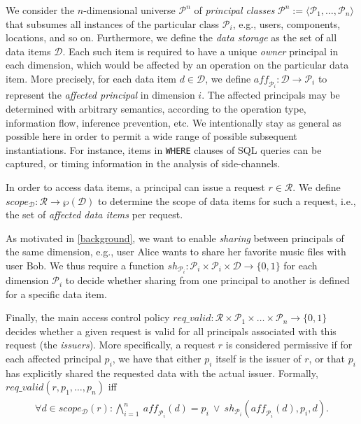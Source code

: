 \documentclass{src/acm_proc_article-sp} \else
\newcommand\cD{\ensuremath{\mathcal{D}}\xspace}
\newcommand\cP{\ensuremath{\mathcal{P}}\xspace}
\newcommand\cR{\ensuremath{\mathcal{R}}\xspace}
\begin{document}
We consider the $n$-dimensional universe $\cP^n$ of
\emph{principal classes}
$\cP^n := \langle \cP_1, \ldots, \cP_n \rangle $ that subsumes all
instances of the particular class $\cP_i$, e.g., users,
components, locations, and so on. Furthermore, we define the
\emph{data storage} as the set of all data items \cD. Each
such item is required to have a unique \emph{owner}
principal in each dimension, which would be affected by an
operation on the particular data item. More precisely, for
each data item $d\in\cD$, we define
$
  \mathit{aff_{\cP_i}}\colon \cD \rightarrow \cP_i
$
to represent the \emph{affected principal} in dimension $i$.
The affected principals may be determined with arbitrary
semantics, according to the operation type, information
flow, inference prevention, etc. We intentionally stay as
general as possible here in order to permit a wide range of
possible subsequent instantiations. For instance, items in
\texttt{WHERE} clauses of SQL queries can be captured, or
timing information in the analysis of side-channels.

In order to access data items, a principal can issue a
request $r \in \cR$. We define
$
  \mathit{scope_{\cD}}\colon \cR \rightarrow \wp(\cD)
$
to determine the scope of data items for such a request,
i.e., the set of \emph{affected data items} per request.

As motivated in \autoref{background}, we want to enable
\emph{sharing} between principals of the same dimension,
e.g., user Alice wants to share her favorite music files
with user Bob. We thus require a function
$
  \mathit{sh_{\cP_i}}\colon \cP_i \times \cP_i \times \cD \rightarrow \{0, 1\}
$
for each dimension $\cP_i$
to decide whether sharing from one principal to another is
defined for a specific data item.



Finally, the main access control policy
$
  \mathit{req\_valid}\colon \cR \times \cP_1 \times \ldots \times \cP_n \rightarrow \{0, 1\}
$
decides whether a given request is valid for all principals associated with
this request (the \emph{issuers}).
More specifically, a request $r$ is considered permissive if for
each affected principal $p_i$, we have that either $p_{i}$
itself is the issuer of $r$, or that $p_{i}$ has explicitly shared
the requested data with the actual issuer. Formally,
$\mathit{req\_valid(r, p_1, \ldots, p_n)}$ iff
\begin{align*}\begin{aligned}
    \forall d \in \mathit{scope_{\cD}(r)}\colon 
    \bigwedge_{i=1}^{n} ~ \mathit{aff_{\cP_i}(d)} = p_i ~\vee~ \mathit{sh_{\cP_i}(aff_{\cP_i}(d), p_i, d)}.
  \end{aligned}
\end{align*}
\end{document}
